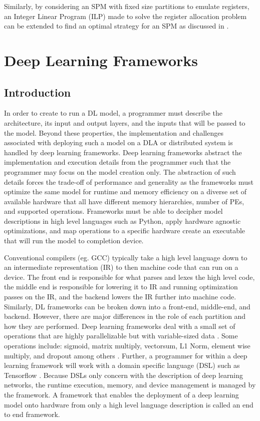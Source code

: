 Similarly, by considering an SPM with fixed size partitions to emulate registers,
an Integer Linear Program (ILP) made to solve the register allocation problem can
be extended to find an optimal strategy for an SPM as discussed in \cite{verma}.

\section{Deep Learning Frameworks}
\subsection{Introduction}
In order to create to run a DL model, a programmer must describe the
architecture, its input and output layers, and the inputs that will be passed
to the model. Beyond these properties, the implementation and challenges
associated with deploying such a model on a DLA or distributed system is
handled by deep learning frameworks. Deep learning frameworks abstract the
implementation and execution details from the programmer such that the
programmer may focus on the model creation only. The abstraction of such
details forces the trade-off of performance and generality as the frameworks
must optimize the same model for runtime and memory efficiency on a diverse set
of available hardware that all have different memory hierarchies, number of PEs,
and supported operations. Frameworks must be able to decipher model
descriptions in high level languages such as Python, apply hardware agnostic
optimizations, and map operations to a specific hardware create an executable
that will run the model to completion device.

Conventional compilers (eg. GCC) typically take a high level language down to
an intermediate representation (IR) to then machine code that can run on a
device.  The front end is responsible for what parses and lexes the high level
code, the middle end is responsible for lowering it to IR and running
optimization passes on the IR, and the backend lowers the IR further into
machine code. Similarly, DL frameworks can be broken down into a front-end,
middle-end, and backend. However, there are major differences in the role of
each partition and how they are performed.  Deep learning frameworks deal with
a small set of operations that are highly parallelizable but with
variable-sized data \cite{nGraph}. Some operations include: sigmoid, matrix
multiply, vectorsum, L1 Norm, element wise multiply, and dropout among others
\cite{cntk}. Further, a programmer for within a deep learning framework will
work with a domain specific language (DSL) such as Tensorflow
\cite{tensorflow}. Because DSLs only concern with the description of deep
learning networks, the runtime execution, memory, and device management is
managed by the framework. A framework that enables the deployment of a deep
learning model onto hardware from only a high level language description is
called an end to end framework.

